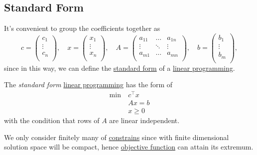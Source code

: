 \subsection{Standard Form}
It's convenient to group the coefficients together as
\[
	c= \begin{pmatrix}
		c_1    \\
		\vdots \\
		c_n    \\
	\end{pmatrix},\quad
	x = \begin{pmatrix}
		x_1    \\
		\vdots \\
		x_n    \\
	\end{pmatrix}, \quad
	A = \begin{pmatrix}
		a_{11} & \dots  & a_{1n} \\
		\vdots & \ddots & \vdots \\
		a_{m1} & \dots  & a_{mn} \\
	\end{pmatrix},\quad
	b = \begin{pmatrix}
		b_1    \\
		\vdots \\
		b_m    \\
	\end{pmatrix},
\]
since in this way, we can define the \hyperref[def:standard-form]{standard form} of a \hyperref[def:general-linear-programming-problem]{linear programming}.

\begin{definition}\label{def:standard-form}
	The \emph{standard form} \hyperref[def:general-linear-programming-problem]{linear programming} has the form of
	\[
		\begin{aligned}
			\min~ & c^{\top}x \\
			      & Ax = b    \\
			      & x\geq 0
		\end{aligned}
	\]
	with the condition that rows of \(A\) are linear independent.
\end{definition}

\begin{remark}
	We only consider finitely many of \hyperref[def:constraint]{constrains} since with finite dimensional solution space will be compact, hence \hyperref[def:objective-function]{objective function} can attain its extremum.
\end{remark}


